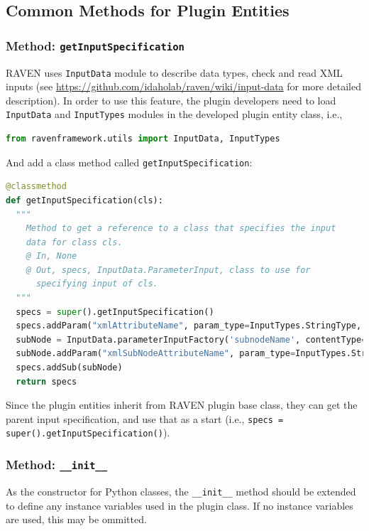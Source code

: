 \subsection{Common Methods for Plugin Entities}
\subsubsection{Method: \texttt{getInputSpecification}}
\label{subsubsec:getInputSpecification}
RAVEN uses \texttt{InputData} module to describe data types, check and read XML inputs
(see \url{https://github.com/idaholab/raven/wiki/input-data} for more detailed description).
In order to use this feature, the plugin developers need to load \texttt{InputData} and \texttt{InputTypes}
modules in the developed plugin entity class, i.e.,
\begin{lstlisting}[language=python]
from ravenframework.utils import InputData, InputTypes
\end{lstlisting}
And add a class method called \texttt{getInputSpecification}:
\begin{lstlisting}[language=python, basicstyle=\scriptsize\ttfamily, breaklines=True, columns=fullflexible]
@classmethod
def getInputSpecification(cls):
  """
    Method to get a reference to a class that specifies the input
    data for class cls.
    @ In, None
    @ Out, specs, InputData.ParameterInput, class to use for
      specifying input of cls.
  """
  specs = super().getInputSpecification()
  specs.addParam("xmlAttributeName", param_type=InputTypes.StringType, required=True, default='no-default', descr='')
  subNode = InputData.parameterInputFactory('subnodeName', contentType=InputTypes.StringType, default='no-default', decr='')
  subNode.addParam("xmlSubNodeAttributeName", param_type=InputTypes.StringType, required=True, default='no-default', descr='')
  specs.addSub(subNode)
  return specs
\end{lstlisting}
Since the plugin entities inherit from RAVEN plugin base class, they can get the parent input specification, and use
that as a start (i.e., \texttt{specs = super().getInputSpecification()}).

\subsubsection{Method: \texttt{\_\_init\_\_}}
\label{subsubsec:init}
As the constructor for Python classes, the \texttt{\_\_init\_\_} method should be extended to define
any instance variables used in the plugin class. If no instance variables are used, this may be ommitted.

